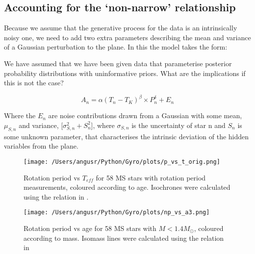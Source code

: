 \documentclass[12pt,preprint]{aastex}
\begin{document}
\subsection{Accounting for the `non-narrow' relationship}

Because we assume that the generative process for the data is an intrinsically noisy one, we need to add two extra parameters describing the mean and variance of a Gaussian perturbation to the plane.
In this the model takes the form:

We have assumed that we have been given data that parameterise posterior probability distributions with uninformative priors.
What are the implications if this is not the case?

\begin{equation}
	A_n = \alpha(T_n - T_K)^\beta \times P_n^\delta + E_n
\end{equation}

Where the $E_n$ are noise contributions drawn from a Gaussian with some mean, $\mu_{S,n}$ and variance, [$\sigma^2_{S,n} + S_n^2$], where $\sigma_{S,n}$ is the uncertainty of star n and $S_n$ is some unknown parameter, that characterises the intrinsic deviation of the hidden variables from the plane.

\begin{figure}[ht]
\begin{center}
\texttt{[image: /Users/angusr/Python/Gyro/plots/p\_vs\_t\_orig.png]}
\caption{Rotation period vs $T_{eff}$ for 58 MS stars with rotation period measurements, coloured according to age.
Isochrones were calculated using the relation in  \citet{Mamajek_2008}.}
\label{fig:results}
\end{center}
\end{figure}

\begin{figure}[ht]
\begin{center}
\texttt{[image: /Users/angusr/Python/Gyro/plots/np\_vs\_a3.png]}
\caption{Rotation period vs age for 58 MS stars with $M<1.4M_\odot$, coloured according to mass. %
Isomass lines were calculated using the relation in \citet{Mamajek_2008}}
\label{fig:results2}
\end{center}
\end{figure}
\end{document}
